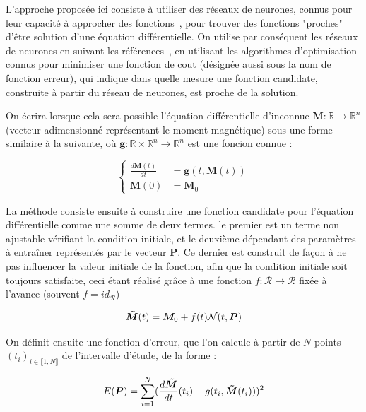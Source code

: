\documentclass[12pt]{report}
\begin{document}
L'approche proposée ici consiste à utiliser des réseaux de neurones, connus pour leur capacité à approcher des fonctions~\cite{FunctionApproximation}, pour trouver des fonctions "proches" d'être solution d'une équation différentielle.
On utilise par conséquent les réseaux de neurones en suivant les références~\cite{MLWithApp,ANNforOPDEs,HighOrderHybrid}, en utilisant les algorithmes d'optimisation connus pour minimiser une fonction de cout (désignée aussi sous la nom de fonction erreur), qui indique dans quelle mesure une fonction candidate, construite à partir du réseau de neurones, est proche de la solution.

On écrira lorsque cela sera possible l'équation différentielle d'inconnue $\bm{M}: \mathbb{R} \to  \mathbb{R}^n$ (vecteur adimensionné représentant le moment magnétique) sous une forme similaire à la suivante, où $\bm{g}:  \mathbb{R}\times\mathbb{R}^n \to  \mathbb{R}^n$ est une foncion connue :

\begin{equation}
    \left\{
        \begin{aligned}
            \frac{d\bm{M}(t)}{dt} &= \bm{g}(t, \bm{M}(t)) \\
            \bm{M}(0) &= \bm{M}_0
        \end{aligned}
    \right.
\label{eq:equa dif example}
\end{equation}

La méthode consiste ensuite à construire une fonction candidate pour l'équation différentielle comme une somme de deux termes.
le premier est un terme non ajustable vérifiant la condition initiale, et le deuxième dépendant des paramètres à entraîner représentés par le vecteur $\bm{P}$. Ce dernier est construit de façon à ne pas influencer la valeur initiale de la fonction, afin que la condition initiale soit toujours satisfaite, ceci étant réalisé grâce à une fonction $f:\mathcal{R}\to\mathcal{R}$ fixée à l'avance (souvent $f = id_{\mathcal{R}}$)

\begin{equation}
    \bm{\Tilde{M}}(t) = \bm{M}_0 + f(t)\mathcal{N}(t,\bm{P}) 
\label{eq:solution candidate générique}
\end{equation}
    
On définit ensuite une fonction d'erreur, que l'on calcule à partir de $N$ points $(t_i)_{i\in \llbracket 1, N \rrbracket}$ de l'intervalle d'étude, de la forme :

\begin{equation}
    E ({\bm P})= \sum_{i=1}^{N} (\frac{d\bm{\Tilde{M}}}{dt}(t_i) -g(t_i, \bm{\Tilde{M}}(t_i)))^2   
\label{eq:fonction d'erreur générique}
\end{equation}
\end{document}
